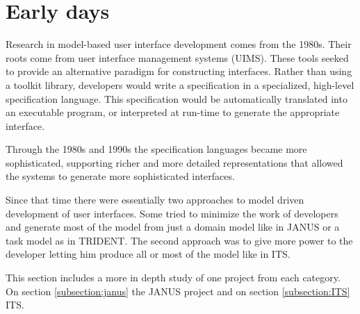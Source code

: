 \section{Early days}
\label{section:early_days}

Research in model-based user interface development comes from the 1980s\cite{SzekelyRetrospective}. Their roots come from user interface management systems (UIMS)\cite{MyersUIMS}. These tools seeked to provide an alternative paradigm for constructing interfaces. Rather than using a toolkit library, developers would write a specification in a specialized, high-level specification language. This specification would be automatically translated into an executable program, or interpreted at run-time to generate the appropriate interface.

Through the 1980s and 1990s the specification languages became more sophisticated, supporting richer and more detailed representations that allowed the systems to generate more sophisticated interfaces.

Since that time there were essentially two approaches to model driven development of user interfaces. Some tried to minimize the work of developers and generate most of the model from just a domain model like in JANUS\cite{janus} or a task model as in TRIDENT\cite{trident1, trident2}. The second approach was to give more power to the developer letting him produce all or most of the model like in ITS\cite{ITS}.

This section includes a more in depth study of one project from each category. On section \ref{subsection:janus} the JANUS project and on section \ref{subsection:ITS} ITS.


